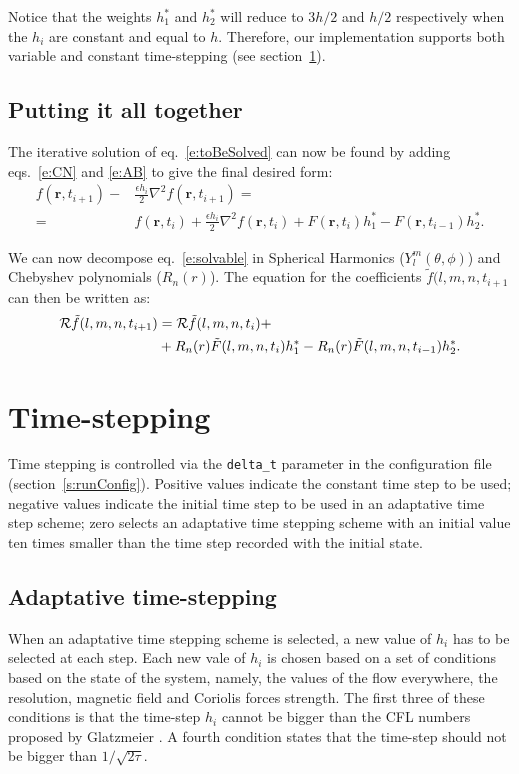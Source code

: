 \documentclass[a4paper,10pt]{book}
\renewcommand{\vec}[1]{\mathbf{#1}}
\begin{document}
Notice that the weights $h^*_1$ and $h^*_2$ will reduce to $3h/2$ and $h/2$
respectively when the $h_i$ are constant and equal to $h$. Therefore, our
implementation supports both variable and constant time-stepping (see
section~\ref{s:timeStepping}).

\subsection{Putting it all together}
The iterative solution of eq.~\ref{e:toBeSolved} can now be found by adding
eqs.~\ref{e:CN} and \ref{e:AB} to give the final desired form:
\begin{align}
f(\vec{r}, t_{i+1}) - &\frac{\epsilon h_i}{2} \nabla^2 f(\vec{r}, t_{i+1}) =
 \nonumber \\
= & f(\vec{r}, t_{i}) +  \frac{\epsilon h_i}{2} \nabla^2 f(\vec{r}, t_{i}) +
     F(\vec{r}, t_i) h^*_1 - F(\vec{r}, t_{i-1}) h^*_2.
  \label{e:solvable}
\end{align}

We can now decompose eq.~\ref{e:solvable} in Spherical Harmonics ($Y_l^m(\theta,
\phi)$) and Chebyshev polynomials ($R_n(r)$). The equation for the coefficients
$\tilde f(l,m,n,t_{i+1}$ can then be written as:
\begin{align}
{\cal R}\tilde f(l,m,n, t_{i+1})  &= {\cal R}\tilde f(l,m,n, t_{i}) +\nonumber \\
 &+ R_n(r)\tilde F(l,m,n, t_i) h^*_1 - R_n(r)\tilde F(l,m,n, t_{i-1}) h^*_2.
  \label{e:solvable_spec}
\end{align}


\section{Time-stepping}
\label{s:timeStepping}

Time stepping is controlled via the \verb|delta_t| parameter in the
configuration file (section~\ref{s:runConfig}). Positive values indicate the
constant time step to be used; negative values indicate the initial time step to
be used in an adaptative time step scheme; zero selects an adaptative time
stepping scheme with an initial value ten times smaller than the time step
recorded with the initial state.

\subsection{Adaptative time-stepping}
When an adaptative time stepping scheme is selected, a new value of $h_i$ has to
be selected at each step. Each new vale of $h_i$ is chosen based on a set of
conditions based on the state of the system, namely, the values of the flow
everywhere, the resolution, magnetic field and Coriolis forces strength. The
first three of these conditions is that the time-step $h_i$ cannot be bigger
than the CFL numbers proposed by Glatzmeier \citep{Glatzmaier1984}. A fourth
condition states that the time-step should not be bigger than $1/\sqrt{2\tau}$.
\end{document}
